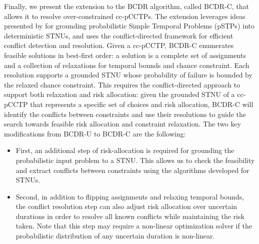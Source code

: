 \documentclass[jair,twoside,11pt,theapa]{article}
\begin{document}
Finally, we present the extension to the BCDR algorithm, called BCDR-C, that
allows it to resolve over-constrained cc-pCCTPs. The extension leverages ideas
presented by  for grounding probabilistic Simple Temporal Problems
(pSTPs) into deterministic STNUs, and uses the conflict-directed framework for
efficient conflict detection and resolution. Given a cc-pCCTP, BCDR-C enumerates
feasible solutions in best-first order: a solution is a complete set of assignments and a collection of relaxations
for temporal bounds and chance constraint. Each resolution supports a
grounded STNU whose probability of failure is bounded by the relaxed chance
constraint. This requires the conflict-directed approach to support both
relaxation and risk allocation: given the grounded STNU of a cc-pCCTP that
represents a specific set of choices and risk allocation, BCDR-C will identify
the conflicts between constraints and use their resolutions to guide the search
towards feasible risk allocation and constraint relaxation. The two key
modifications from BCDR-U to BCDR-C are the following:


\begin{itemize}


	\item First, an additional step of risk-allocation is required for grounding
	the probabilistic input problem to a STNU. This allows us to check the
	feasibility and extract conflicts between constraints using the algorithms developed for STNUs.

	\item Second, in addition to flipping assignments and relaxing temporal bounds, the conflict resolution step can also adjust risk allocation over uncertain durations in order to resolve all known conflicts while maintaining
	the risk taken. Note that this step may
	require a non-linear optimization solver if the probabilistic distribution of
	any uncertain duration is non-linear.

\end{itemize}
\end{document}
